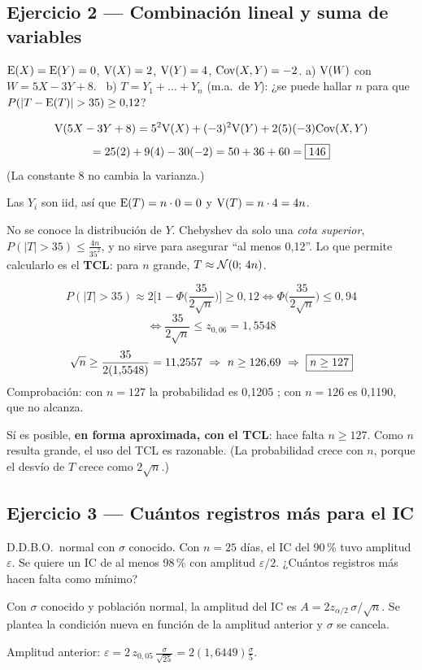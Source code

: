 \subsection{Ejercicio 2 --- Combinación lineal y suma de variables}
\begin{enun}
$\mathrm{E}(X)=\mathrm{E}(Y)=0$, $\mathrm{V}(X)=2$, $\mathrm{V}(Y)=4$, $\mathrm{Cov}(X,Y)=-2$.
a) $\mathrm{V}(W)$ con $W=5X-3Y+8$. \ b) $T=Y_1+\dots+Y_n$ (m.a.\ de $Y$): ¿se puede hallar $n$ para que $P(|T-\E(T)|>35)\ge0{,}12$?
\end{enun}
\[
\mathrm{V}(5X-3Y+8)=5^2\mathrm{V}(X)+(-3)^2\mathrm{V}(Y)+2(5)(-3)\mathrm{Cov}(X,Y)
\]
\[
=25(2)+9(4)-30(-2)=50+36+60=\boxed{146}
\]
(La constante 8 no cambia la varianza.)

 Las $Y_i$ son iid, así que $\mathrm{E}(T)=n\cdot0=0$ y $\mathrm{V}(T)=n\cdot4=4n$.

 No se conoce la distribución de $Y$. Chebyshev da solo una \emph{cota superior}, $P(|T|>35)\le\frac{4n}{35^2}$, y no sirve para asegurar ``al menos 0,12''. Lo que permite calcularlo es el \textbf{TCL}: para $n$ grande, $T\approx\mathcal{N}(0;\,4n)$.

\[
P(|T|>35)\approx2\Big[1-\Phi\Big(\frac{35}{2\sqrt n}\Big)\Big]\ge0{,}12\iff\Phi\Big(\frac{35}{2\sqrt n}\Big)\le0{,}94
\]
\[
\iff\frac{35}{2\sqrt n}\le z_{0,06}=1{,}5548
\]
\[
\sqrt n\ge\frac{35}{2(1{,}5548)}=11{,}2557\ \Rightarrow\ n\ge126{,}69\ \Rightarrow\ \res{n\ge127}
\]
Comprobación: con $n=127$ la probabilidad es 0,1205 \checkmark; con $n=126$ es 0,1190, que no alcanza.
\begin{resp}
Sí es posible, \textbf{en forma aproximada, con el TCL}: hace falta $n\ge127$. Como $n$ resulta grande, el uso del TCL es razonable. (La probabilidad crece con $n$, porque el desvío de $T$ crece como $2\sqrt n$.)
\end{resp}

\subsection{Ejercicio 3 --- Cuántos registros más para el IC}
\begin{enun}
D.D.B.O.\ normal con $\sigma$ conocido. Con $n=25$ días, el IC del 90\,\% tuvo amplitud $\varepsilon$. Se quiere un IC de al menos 98\,\% con amplitud $\varepsilon/2$. ¿Cuántos registros más hacen falta como mínimo?
\end{enun}
\begin{metodo}
Con $\sigma$ conocido y población normal, la amplitud del IC es $A=2z_{\alpha/2}\,\sigma/\sqrt n$. Se plantea la condición nueva en función de la amplitud anterior y $\sigma$ se cancela.
\end{metodo}
 Amplitud anterior: $\varepsilon=2\,z_{0,05}\,\frac{\sigma}{\sqrt{25}}=2(1{,}6449)\frac{\sigma}{5}$.

